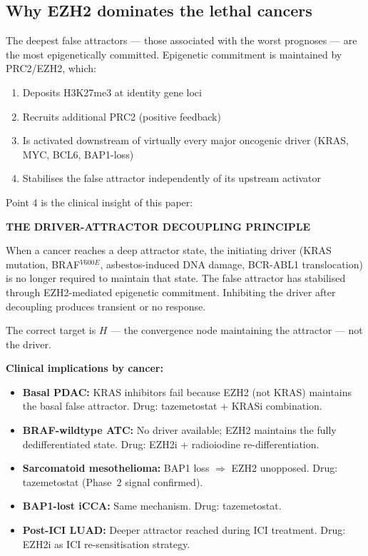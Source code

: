 \documentclass[11pt, a4paper]{article}
\begin{document}
\subsection{Why EZH2 dominates the lethal cancers}

The deepest false attractors --- those associated with
the worst prognoses --- are the most epigenetically
committed. Epigenetic commitment is maintained by
PRC2/EZH2, which:

\begin{enumerate}
    \item Deposits H3K27me3 at identity gene loci
    \item Recruits additional PRC2 (positive feedback)
    \item Is activated downstream of virtually every
    major oncogenic driver (KRAS, MYC, BCL6, BAP1-loss)
    \item Stabilises the false attractor independently
    of its upstream activator
\end{enumerate}

Point 4 is the clinical insight of this paper:

\begin{mdframed}[backgroundcolor=novelbox,
                 linecolor=red!50!black,
                 linewidth=1.5pt]
\textbf{THE DRIVER-ATTRACTOR DECOUPLING PRINCIPLE}

When a cancer reaches a deep attractor state, the
initiating driver (KRAS mutation, BRAF$^{V600E}$,
asbestos-induced DNA damage, BCR-ABL1 translocation)
is no longer required to maintain that state.
The false attractor has stabilised through EZH2-mediated
epigenetic commitment. Inhibiting the driver after
decoupling produces transient or no response.

The correct target is $H$ --- the convergence node
maintaining the attractor --- not the driver.

\medskip
\textbf{Clinical implications by cancer:}
\begin{itemize}[noitemsep]
    \item \textbf{Basal PDAC:} KRAS inhibitors fail
    because EZH2 (not KRAS) maintains the basal false
    attractor. Drug: tazemetostat + KRASi combination.
    \item \textbf{BRAF-wildtype ATC:} No driver
    available; EZH2 maintains the fully dedifferentiated
    state. Drug: EZH2i + radioiodine re-differentiation.
    \item \textbf{Sarcomatoid mesothelioma:} BAP1 loss
    $\Rightarrow$ EZH2 unopposed. Drug: tazemetostat
    (Phase~2 signal confirmed).
    \item \textbf{BAP1-lost iCCA:} Same mechanism.
    Drug: tazemetostat.
    \item \textbf{Post-ICI LUAD:} Deeper attractor
    reached during ICI treatment. Drug: EZH2i as
    ICI re-sensitisation strategy.
\end{itemize}
\end{mdframed}
\end{document}
